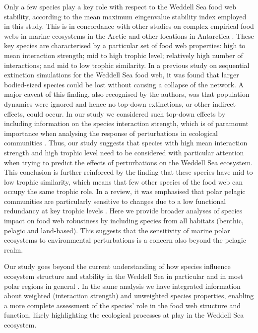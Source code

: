 \documentclass[gc, manuscript]{copernicus}
\begin{document}
Only a few species play a key role with respect to the Weddell Sea food
web stability, according to the mean maximum eingenvalue stability index
employed in this study. This is in concordance with other studies on
complex empirical food webs in marine ecosystems in the Arctic and other
locations in Antarctica \citep{Kortsch2015, Marina2018, Rodriguez2022}.
These key species are characterised by a particular set of food web
properties: high to mean interaction strength; mid to high trophic
level; relatively high number of interactions; and mid to low trophic
similarity. In a previous study on sequential extinction simulations for
the Weddell Sea food web, it was found that larger bodied-sized species
could be lost without causing a collapse of the network. A major caveat
of this finding, also recognised by the authors, was that population
dynamics were ignored and hence no top-down extinctions, or other
indirect effects, could occur. In our study we considered such top-down
effects by including information on the species interaction strength,
which is of paramount importance when analysing the response of
perturbations in ecological communities
\citep{McCann1998, Montoya2009, Novak2011}. Thus, our study suggests
that species with high mean interaction strength and high trophic level
need to be considered with particular attention when trying to predict
the effects of perturbations on the Weddell Sea ecosystem. This
conclusion is further reinforced by the finding that these species have
mid to low trophic similarity, which means that few other species of the
food web can occupy the same trophic role. In a review, it was
emphasised that polar pelagic communities are particularly sensitive to
changes due to a low functional redundancy at key trophic levels
\citep{Murphy2016}. Here we provide broader analyses of species impact
on food web robustness by including species from all habitats (benthic,
pelagic and land-based). This suggests that the sensitivity of marine
polar ecosystems to environmental perturbations is a concern also beyond
the pelagic realm.

\clearpage
\conclusions[Conclusions]

Our study goes beyond the current understanding of how species influence
ecosystem structure and stability in the Weddell Sea in particular and
in most polar regions in general \citep{Murphy2016, McCormack2021}. In
the same analysis we have integrated information about weighted
(interaction strength) and unweighted species properties, enabling a
more complete assessment of the species' role in the food web structure
and function, likely highlighting the ecological processes at play in
the Weddell Sea ecosystem.
\end{document}
